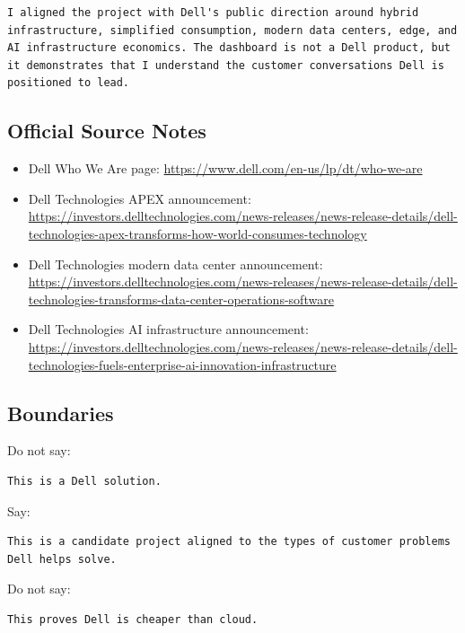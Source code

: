 \documentclass[11pt,a4paper]{article}
\begin{document}
\begin{lstlisting}
I aligned the project with Dell's public direction around hybrid infrastructure, simplified consumption, modern data centers, edge, and AI infrastructure economics. The dashboard is not a Dell product, but it demonstrates that I understand the customer conversations Dell is positioned to lead.
\end{lstlisting}

\subsection{Official Source Notes}

\begin{itemize}
  \item Dell Who We Are page: \url{https://www.dell.com/en-us/lp/dt/who-we-are}
  \item Dell Technologies APEX announcement: \url{https://investors.delltechnologies.com/news-releases/news-release-details/dell-technologies-apex-transforms-how-world-consumes-technology}
  \item Dell Technologies modern data center announcement: \url{https://investors.delltechnologies.com/news-releases/news-release-details/dell-technologies-transforms-data-center-operations-software}
  \item Dell Technologies AI infrastructure announcement: \url{https://investors.delltechnologies.com/news-releases/news-release-details/dell-technologies-fuels-enterprise-ai-innovation-infrastructure}
\end{itemize}

\subsection{Boundaries}

Do not say:

\begin{lstlisting}
This is a Dell solution.
\end{lstlisting}

Say:

\begin{lstlisting}
This is a candidate project aligned to the types of customer problems Dell helps solve.
\end{lstlisting}

Do not say:

\begin{lstlisting}
This proves Dell is cheaper than cloud.
\end{lstlisting}
\end{document}

